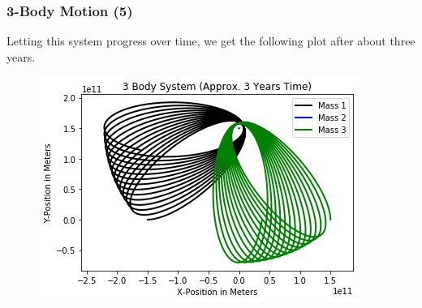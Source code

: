 \documentclass{beamer}
\begin{document}
\begin{frame}
\frametitle{3-Body Motion (5)}
Letting this system progress over time, we get the following plot after about three years.
\begin{figure}
\begin{center}
\includegraphics[width=0.90\linewidth]{3BodyDynamics5.png}
\end{center}
\end{figure}
\end{frame}
\end{document}
